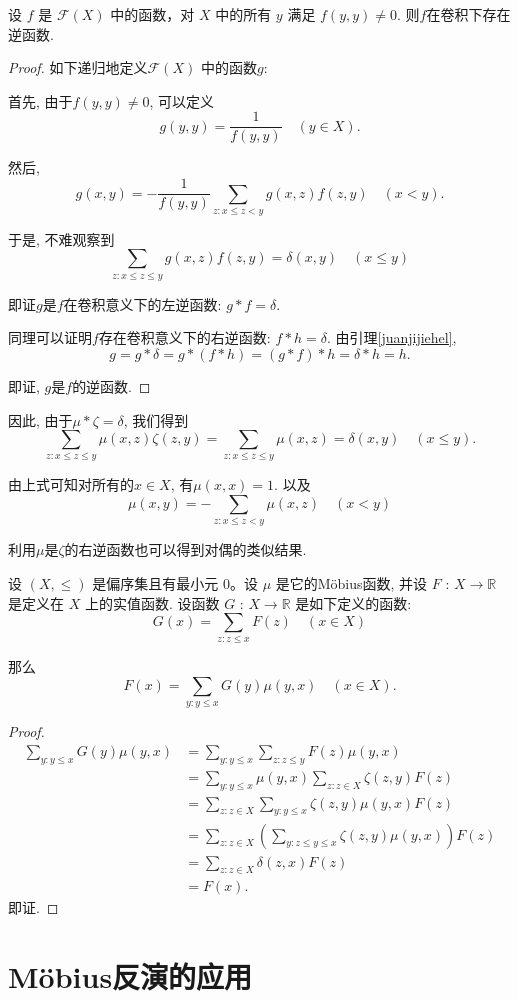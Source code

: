 \begin{lemma}
    设 $f$ 是 $\mathcal{F}(X)$ 中的函数，对 $X$ 中的所有 $y$ 满足 $f(y, y) \neq 0$. 则$f$在卷积下存在逆函数.
\end{lemma}

\begin{proof}
    如下递归地定义$\mathcal{F}(X)$ 中的函数$g$:

    首先, 由于$f(y, y) \neq 0$, 可以定义 $$g(y, y) = \frac{1}{f(y, y)} \quad (y \in X).$$

    然后, $$g(x, y) = -\frac{1}{f(y, y)} \sum_{z:x\leq z < y} g(x, z) f(z, y) \quad (x < y).$$

    于是, 不难观察到 $$\sum_{z:x\leq z \leq y} g(x, z) f(z, y) = \delta(x, y) \quad (x \leq y)$$

    即证$g$是$f$在卷积意义下的左逆函数: $g*f=\delta$.

    同理可以证明$f$存在卷积意义下的右逆函数: $f*h=\delta$. 由引理\ref{juanjijiehel}, $$g = g * \delta = g * (f * h) = (g * f) * h = \delta * h = h.$$

    即证, $g$是$f$的逆函数.
\end{proof}

因此, 由于$\mu*\zeta=\delta$, 我们得到
$$\sum_{z : x \leq z \leq y} \mu(x, z) \zeta(z, y) = \sum_{z : x \leq z \leq y} \mu(x, z)=\delta(x, y) \quad (x \leq y).$$

由上式可知对所有的$x\in X$, 有$\mu(x,x)=1$. 以及$$\mu(x, y) = -\sum_{z : x \leq z < y} \mu(x, z) \quad (x < y)$$

利用$\mu$是$\zeta$的右逆函数也可以得到对偶的类似结果.

\begin{theorem}[Möbius反演]
    设 $(X, \leq)$ 是偏序集且有最小元 $0$。设 $\mu$ 是它的Möbius函数, 并设 $F$ : $X \rightarrow \mathbb{R}$ 是定义在 $X$ 上的实值函数. 设函数 $G$ : $X \rightarrow \mathbb{R}$ 是如下定义的函数:
\[ G(x) = \sum_{z : z \leq x} F(z) \quad (x \in X) \]

那么
\[ F(x) = \sum_{y : y \leq x} G(y) \mu(y, x) \quad (x \in X). \]
\end{theorem}

\begin{proof}
    \begin{align*}
\sum_{y : y \leq x} G(y) \mu(y, x) &= \sum_{y : y \leq x} \sum_{z : z \leq y} F(z) \mu(y, x) \\
&= \sum_{y : y \leq x} \mu(y, x) \sum_{z : z \in X} \zeta(z, y) F(z) \\
&= \sum_{z : z \in X} \sum_{y : y \leq x} \zeta(z, y) \mu(y, x) F(z) \\
&= \sum_{z : z \in X} \left( \sum_{y : z \leq y \leq x} \zeta(z, y) \mu(y, x) \right) F(z) \\
&= \sum_{z : z \in X} \delta(z, x) F(z) \\
&= F(x).
\end{align*}即证.
\end{proof}

\section{Möbius反演的应用}